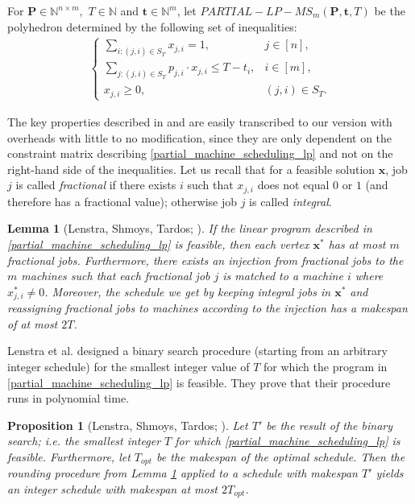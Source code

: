 \documentclass[moor,sglanonrev]{informs4}
\theoremstyle{plain}
\newtheorem{lmm}{Lemma}  %
\newtheorem{prop}{Proposition}  %
\begin{document}
\begin{definition}
    For $\bm{P} \in \mathbb{N}^{n\times m}, \,\, T \in \mathbb{N}$ and $\bm{t} \in \mathbb{N}^m$, let $PARTIAL-LP-MS_m(\bm{P}, \bm{t}, T)$ be the polyhedron determined by the following set of inequalities:
    \begin{align}\label{partial_machine_scheduling_lp}
        \begin{cases}
            \sum\limits_{i: (j,i) \in S_T} x_{j,i} = 1, & j\in [n], \\
            \sum\limits_{j: (j,i) \in S_T} p_{j,i} \cdot  x_{j,i} \le T-t_i, & i \in [m], \\
            x_{j,i} \ge 0, & (j,i) \in S_T.
        \end{cases}
    \end{align}
    \label{def:binary_search_poly}
\end{definition}

The key properties described in \cite{lenstra_shmoys_tardos} and \cite{vazirani} are easily transcribed to our version with overheads with little to no modification, since they are only dependent on the constraint matrix describing \eqref{partial_machine_scheduling_lp} and not on the right-hand side of the inequalities. Let us recall that for a feasible solution $\bm{x}$, job $j$ is called \emph{fractional} if there exists $i$ such that $x_{j,i}$ does not equal $0$ or $1$ (and therefore has a fractional value); otherwise job $j$ is called \emph{integral}.

\begin{lmm}[Lenstra, Shmoys, Tardos; \cite{lenstra_shmoys_tardos}]\label{rounding}
    If the linear program described in \eqref{partial_machine_scheduling_lp} is feasible, then each vertex $\bm{x}^*$ has at most $m$ fractional jobs. Furthermore, there exists an injection from fractional jobs to the $m$ machines such that each fractional job $j$ is matched to a machine $i$ where $x^*_{j,i}\ne 0$. Moreover, the schedule we get by keeping integral jobs in $\bm{x}^*$ and reassigning fractional jobs to machines according to the injection has a makespan of at most $2T$.
\end{lmm}

Lenstra et al. designed a binary search procedure (starting from an arbitrary integer schedule) for the smallest integer value of $T$ for which the program in \eqref{partial_machine_scheduling_lp} is feasible. They prove that their procedure runs in polynomial time.

\begin{prop}[Lenstra, Shmoys, Tardos; \cite{lenstra_shmoys_tardos}]\label{2_approx_machine}
    Let $T'$ be the result of the binary search; i.e. the smallest integer $T$ for which \eqref{partial_machine_scheduling_lp} is feasible. Furthermore, let $T_{opt}$ be the makespan of the optimal schedule. Then the rounding procedure from Lemma \ref{rounding} applied to a schedule with makespan $T'$ yields an integer schedule with makespan at most $2T_{opt}$.
\end{prop}
\end{document}
